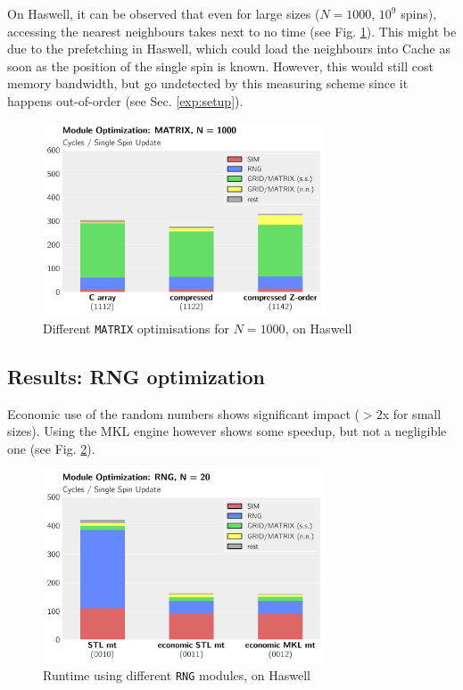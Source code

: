 \documentclass[letterpaper]{article}
\begin{document}
On Haswell, it can be observed that even for large sizes ($N=1000$, $10^9$ spins), accessing the nearest neighbours takes next to no time (see Fig. \ref{MATRIX:Has:1000}). This might be due to the prefetching in Haswell, which could load the neighbours into Cache as soon as the position of the single spin is known. However, this would still cost memory bandwidth, but go undetected by this measuring scheme since it happens out-of-order (see Sec. \ref{exp:setup}). 
	\begin{figure}[h]\centering
	  \includegraphics[width = 8.36cm]{plots/dg_1000_3.pdf}
	  \caption{Different \texttt{MATRIX} optimisations for $N = 1000$, on Haswell}
	  \label{MATRIX:Has:1000}
	\end{figure}
\subsection{Results: RNG optimization}
Economic use of the random numbers shows significant impact ($>2$x for small sizes). Using the MKL engine however shows some speedup, but not a negligible one (see Fig. \ref{RNG:Has:20}).
	\begin{figure}[h]\centering
	  \includegraphics[width = 8.36cm]{plots/dg_20_0.pdf}
	  \caption{Runtime using different \texttt{RNG} modules, on Haswell}
	  \label{RNG:Has:20}
	\end{figure}
\end{document}
